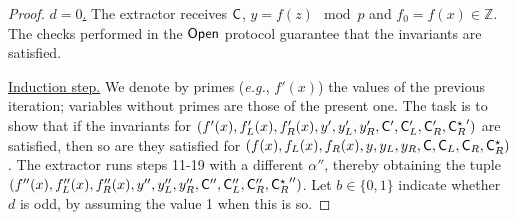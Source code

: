\documentclass{article}
\theoremstyle{definition}
\begin{document}
\begin{proof}
\underline{$d = 0$.} The extractor receives $\mathsf{C}$, $y = f(z) \mod p$ and $f_0 = f(x) \in \mathbb{Z}$. The checks performed in the $\textsf{{Open}}$ protocol guarantee that the invariants are satisfied.

\underline{Induction step.} We denote by primes (\emph{e.g.}, $f'(x)$) the values of the previous iteration; variables without primes are those of the present one. The task is to show that if the invariants for $(f'(x), f_L'(x), f_R'(x), y', y_L', y_R', \mathsf{C}', \mathsf{C}_L', \mathsf{C}_R', {\mathsf{C}_R^{\star}}')$ are satisfied, then so are they satisfied for $(f(x), f_L(x), f_R(x), y, y_L, y_R, \mathsf{C}, \mathsf{C}_L, \mathsf{C}_R, \mathsf{C}_R^{\star})$. The extractor runs steps 11-19 with a different $\alpha''$, thereby obtaining the tuple $(f''(x), f_L''(x), f_R''(x), y'', y_L'', y_R'', \mathsf{C}'', \mathsf{C}_L'', \mathsf{C}_R'', {\mathsf{C}_R^{\star}}'')$. Let $b \in \{0,1\}$ indicate whether $d$ is odd, by assuming the value 1 when this is so.


\end{proof}
\end{document}
